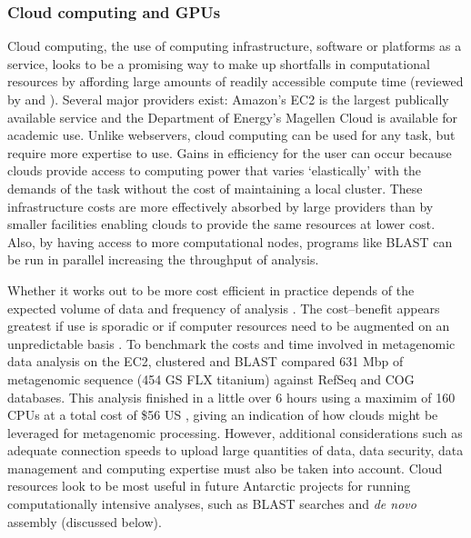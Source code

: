 \subsubsection{Cloud computing and \acs{GPU}s}
Cloud computing, the use of computing infrastructure, software or platforms as a service, looks to be a promising way to make up shortfalls in computational resources by affording large amounts of readily accessible compute time (reviewed by \citet{Schatz2010} and \citet{Thakur2012}).
Several major providers exist: Amazon's \ac{EC2} is the largest publically available service and the Department of Energy's Magellen Cloud is available for academic use.
Unlike webservers, cloud computing can be used for any task, but require more expertise to use.
Gains in efficiency for the user can occur because clouds provide access to computing power that varies `elastically' with the demands of the task without the cost of maintaining a local cluster.
These infrastructure costs are more effectively absorbed by large providers than by smaller facilities enabling clouds to provide the same resources at lower cost.
Also, by having access to more computational nodes, programs like \acs{BLAST} can be run in parallel increasing the throughput of analysis.

Whether it works out to be more cost efficient in practice depends of the expected volume of data and frequency of analysis \cite{Wilkening2009}.
The cost--benefit appears greatest if use is sporadic or if computer resources need to be augmented on an unpredictable basis \cite{Wilkening2009}.
To benchmark the costs and time involved in metagenomic data analysis on the \ac{EC2}, \citet{Angiuoli2011} clustered and \acs{BLAST} compared 631 Mbp of metagenomic sequence (454 GS FLX titanium) against RefSeq and \acs{COG} databases.
This analysis finished in a little over 6 hours using a maximim of 160 \acs{CPU}s at a total cost of \$56 US \cite{Angiuoli2011}, giving an indication of how clouds might be leveraged for metagenomic processing.
However, additional considerations such as adequate connection speeds to upload large quantities of data, data security, data management and computing expertise must also be taken into account.
Cloud resources look to be most useful in future Antarctic projects for running computationally intensive analyses, such as \acs{BLAST} searches and \emph{de novo} assembly (discussed below).

